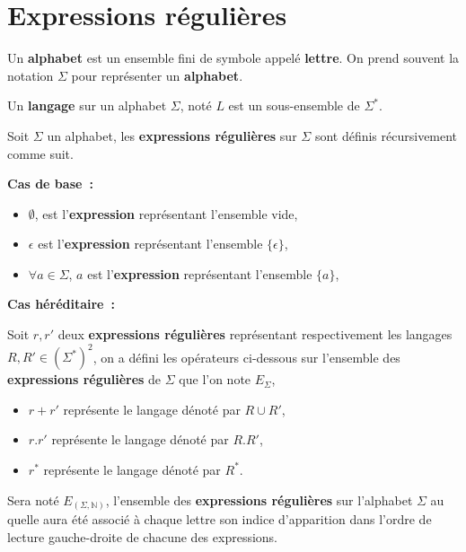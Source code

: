 \section{Expressions régulières}

\begin{Definition}
  Un \textbf{alphabet} est un ensemble fini de symbole appelé \textbf{lettre}.
  On prend souvent la notation \(\Sigma\) pour représenter un \textbf{alphabet}.
\end{Definition}

\begin{Definition}
  Un \textbf{langage} sur un alphabet \(\Sigma\), noté \(L\) est un 
  sous-ensemble de \(\Sigma^*\).
\end{Definition}

\begin{Definition}
  Soit \(\Sigma\) un alphabet, les \textbf{expressions régulières} sur 
  \(\Sigma\) sont définis récursivement comme suit.

  \noindent\textbf{Cas de base~:}

  \begin{itemize}
    \item \(\emptyset\), est l'\textbf{expression} représentant l'ensemble vide,
    \item \(\epsilon\) est l'\textbf{expression} représentant l'ensemble 
    \(\{\epsilon\}\),
    \item \(\forall a \in \Sigma\), \(a\) est l'\textbf{expression} représentant 
    l'ensemble \(\{a\}\),
  \end{itemize}

  \noindent\textbf{Cas héréditaire~:}

  Soit \(r, r'\) deux \textbf{expressions régulières} représentant 
  respectivement les langages \(R, R' \in (\Sigma^*)^2\), on a défini les 
  opérateurs ci-dessous sur l'ensemble des \textbf{expressions régulières} de 
  \(\Sigma\) que l'on note \(E_{\Sigma}\),

  \begin{itemize}
    \item \(r + r'\) représente le langage dénoté par \(R \cup R'\),
    \item \(r . r'\) représente le langage dénoté par \(R . R'\),
    \item \(r^*\) représente le langage dénoté par \(R^*\).
  \end{itemize}
\end{Definition}

\begin{Definition}
  Sera noté \(E_{(\Sigma, \mathbb{N})}\), l'ensemble des 
  \textbf{expressions régulières} sur l'alphabet \(\Sigma\) au quelle aura été 
  associé à chaque lettre son indice d'apparition dans l'ordre de lecture 
  gauche-droite de chacune des expressions.
\end{Definition}


